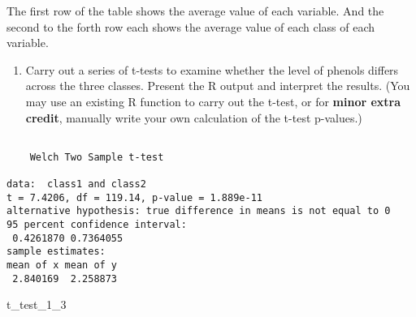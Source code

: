 \documentclass[
  letterpaper,
  DIV=11,
  numbers=noendperiod]{scrartcl}
\newenvironment{Shaded}{\begin{snugshade}}{\end{snugshade}}
\newcommand{\DecValTok}[1]{\textcolor[rgb]{0.68,0.00,0.00}{#1}}
\newcommand{\FunctionTok}[1]{\textcolor[rgb]{0.28,0.35,0.67}{#1}}
\newcommand{\NormalTok}[1]{\textcolor[rgb]{0.00,0.23,0.31}{#1}}
\newcommand{\OtherTok}[1]{\textcolor[rgb]{0.00,0.23,0.31}{#1}}
\newcommand{\SpecialCharTok}[1]{\textcolor[rgb]{0.37,0.37,0.37}{#1}}
\newcommand{\StringTok}[1]{\textcolor[rgb]{0.13,0.47,0.30}{#1}}
\providecommand{\tightlist}{%
  \setlength{\itemsep}{0pt}\setlength{\parskip}{0pt}}\usepackage{longtable,booktabs,array}
\begin{document}
The first row of the table shows the average value of each variable. And
the second to the forth row each shows the average value of each class
of each variable.

\begin{enumerate}
\def\labelenumi{\alph{enumi}.}
\setcounter{enumi}{4}
\tightlist
\item
  Carry out a series of t-tests to examine whether the level of phenols
  differs across the three classes. Present the R output and interpret
  the results. (You may use an existing R function to carry out the
  t-test, or for \textbf{minor extra credit}, manually write your own
  calculation of the t-test p-values.)
\end{enumerate}

\begin{Shaded}
\end{Shaded}

\begin{verbatim}

    Welch Two Sample t-test

data:  class1 and class2
t = 7.4206, df = 119.14, p-value = 1.889e-11
alternative hypothesis: true difference in means is not equal to 0
95 percent confidence interval:
 0.4261870 0.7364055
sample estimates:
mean of x mean of y 
 2.840169  2.258873 
\end{verbatim}

\begin{Shaded}
\begin{Highlighting}[]
\NormalTok{t\_test\_1\_3}
\end{Highlighting}
\end{Shaded}
\end{document}
